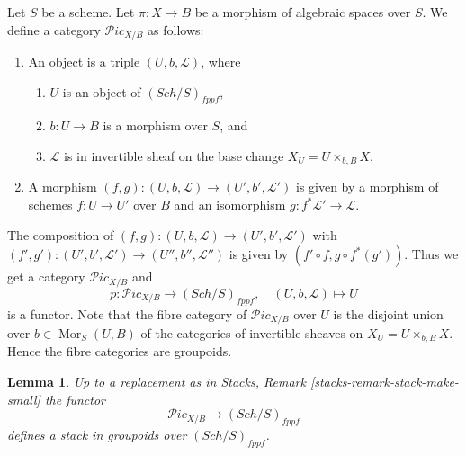 \documentclass{stacks-project}
\theoremstyle{plain}
\newtheorem{lemma}[subsection]{Lemma}
\theoremstyle{definition}
\theoremstyle{remark}
\numberwithin{equation}{subsection}
\def\Sch{\mathit{Sch}}
\def\Mor{\mathop{\mathrm{Mor}}\nolimits}
\def\Picardstack{\mathcal{P}\!\mathit{ic}}
\begin{document}
\medskip\noindent
Let $S$ be a scheme.
Let $\pi : X \to B$ be a morphism of algebraic spaces over $S$.
We define a category $\Picardstack_{X/B}$ as follows:
\begin{enumerate}
\item An object is a triple $(U, b, \mathcal{L})$, where
\begin{enumerate}
\item $U$ is an object of $(\Sch/S)_{fppf}$,
\item $b : U \to B$ is a morphism over $S$, and
\item $\mathcal{L}$ is in invertible sheaf on the base change
$X_U = U \times_{b, B} X$.
\end{enumerate}
\item A morphism $(f, g) : (U, b, \mathcal{L}) \to (U', b', \mathcal{L}')$
is given by a morphism of schemes $f : U \to U'$ over $B$ and an
isomorphism $g : f^*\mathcal{L}' \to \mathcal{L}$.
\end{enumerate}
The composition of
$(f, g) : (U, b, \mathcal{L}) \to (U', b', \mathcal{L}')$
with
$(f', g') : (U', b', \mathcal{L}') \to (U'', b'', \mathcal{L}'')$
is given by $(f' \circ f, g \circ f^*(g'))$.
Thus we get a category $\Picardstack_{X/B}$ and
$$
p : \Picardstack_{X/B} \longrightarrow (\Sch/S)_{fppf},
\quad
(U, b, \mathcal{L}) \longmapsto U
$$
is a functor. Note that the fibre category of $\Picardstack_{X/B}$ over $U$
is the disjoint union over $b \in \Mor_S(U, B)$ of the categories
of invertible sheaves on $X_U = U \times_{b, B} X$. Hence the fibre
categories are groupoids.

\begin{lemma}
\label{lemma-picard-stack}
Up to a replacement as in
Stacks, Remark \ref{stacks-remark-stack-make-small}
the functor
$$
\Picardstack_{X/B} \longrightarrow (\Sch/S)_{fppf}
$$
defines a stack in groupoids over $(\Sch/S)_{fppf}$.
\end{lemma}
\end{document}

